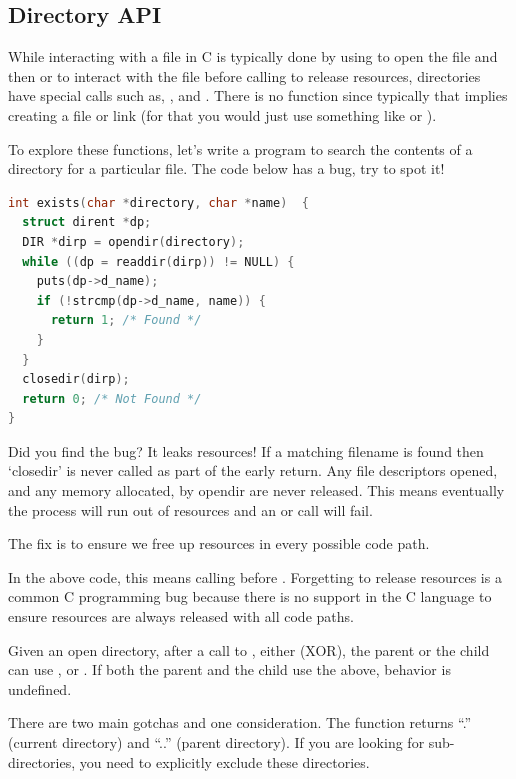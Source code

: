 \subsection{Directory API}

While interacting with a file in C is typically done by using  to open the file and then  or  to interact with the file before calling  to release resources, directories have special calls such as, ,  and .
There is no function  since typically that implies creating a file or link (for that you would just use something like  or ).

To explore these functions, let's write a program to search the contents of a directory for a particular file.
The code below has a bug, try to spot it!

\begin{lstlisting}[language=C]
int exists(char *directory, char *name)  {
  struct dirent *dp;
  DIR *dirp = opendir(directory);
  while ((dp = readdir(dirp)) != NULL) {
    puts(dp->d_name);
    if (!strcmp(dp->d_name, name)) {
      return 1; /* Found */
    }
  }
  closedir(dirp);
  return 0; /* Not Found */
}
\end{lstlisting}

Did you find the bug?
It leaks resources!
If a matching filename is found then `closedir' is never called as part of the early return.
Any file descriptors opened, and any memory allocated, by opendir are never released.
This means eventually the process will run out of resources and an  or  call will fail.

The fix is to ensure we free up resources in every possible code path.

In the above code, this means calling  before .
Forgetting to release resources is a common C programming bug because there is no support in the C language to ensure resources are always released with all code paths.


Given an open directory, after a call to , either (XOR), the parent or the child can use ,  or .
If both the parent and the child use the above, behavior is undefined.

There are two main gotchas and one consideration.
The  function returns ``.'' (current directory) and ``..'' (parent directory).
If you are looking for sub-directories, you need to explicitly exclude these directories.

